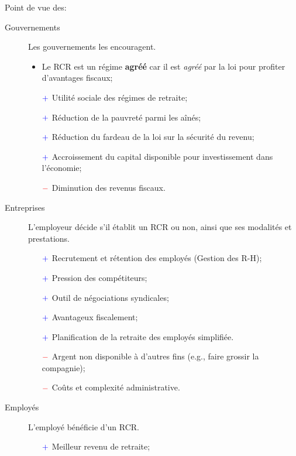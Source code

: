 \documentclass[10pt, french]{article}
\begin{document}
\begin{multicols*}{3}
Point de vue des:
\begin{description}
	\item[Gouvernements]	Les gouvernements les encouragent.
		\begin{itemize}[leftmargin = *]
		\item	Le RCR est un régime \textbf{agréé} car il est \textit{agréé} par la loi pour profiter d'avantages fiscaux;
		\item[$\color{blue}+$]	Utilité sociale des régimes de retraite;
		\item[$\color{blue}+$]	Réduction de la pauvreté parmi les aînés;
		\item[$\color{blue}+$]	Réduction du fardeau de la loi sur la sécurité du revenu;
		\item[$\color{blue}+$]	Accroissement du capital disponible pour investissement dans l'économie;
		\item[$\color{red}-$]	Diminution des revenus fiscaux.
		\end{itemize}
	\item[Entreprises]	L'employeur décide s'il établit un RCR ou non, ainsi que ses modalités et prestations.
		\begin{itemize}[leftmargin = *]
		\item[$\color{blue}+$]	Recrutement et rétention des employés  (Gestion des R-H);
		\item[$\color{blue}+$]	Pression des compétiteurs;
		\item[$\color{blue}+$]	Outil de négociations syndicales;
		\item[$\color{blue}+$]	Avantageux fiscalement;
		\item[$\color{blue}+$]	Planification de la retraite des employés simplifiée.
		\item[$\color{red}-$]	Argent non disponible à d'autres fins (e.g., faire grossir la compagnie);
		\item[$\color{red}-$]	Coûts et complexité administrative.
		\end{itemize}
	\item[Employés]	L'employé bénéficie d'un RCR.
		\begin{itemize}[leftmargin = *]
		\item[$\color{blue}+$]	Meilleur revenu de retraite;

\end{itemize}
\end{description}
\end{multicols*}
\end{document}
